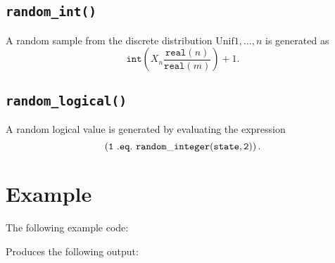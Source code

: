 \subsection{\tt random\_int()}
A random sample from the discrete distribution $\mathrm{Unif}{1, \ldots, n}$ is
generated as
$$
   \texttt{int}\left( X_n \frac{\texttt{real}(n)}{\texttt{real}(m)} \right) + 1.
$$

\subsection{\tt random\_logical()}
A random logical value is generated by evaluating the expression
$$
\tt \left(1\ .eq.\ random\_integer(state, 2)\right).
$$



\section{Example} \label{examples}

The following example code:

Produces the following output:
\begin{verbatim}
\end{verbatim}
